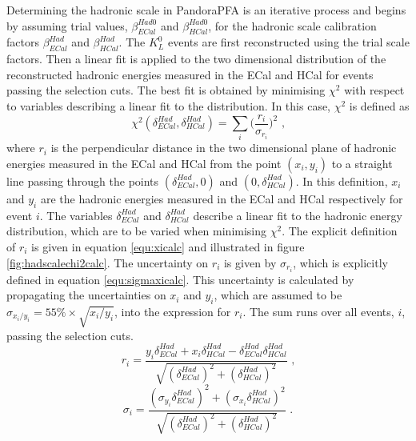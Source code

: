 Determining the hadronic scale in PandoraPFA is an iterative process and begins by assuming trial values, $\beta^{Had0}_{ECal}$ and $\beta^{Had0}_{HCal}$, for the hadronic scale calibration factors $\beta^{Had}_{ECal}$ and $\beta^{Had}_{HCal}$.  The $K^{0}_{L}$ events are first reconstructed using the trial scale factors.  Then a linear fit is applied to the two dimensional distribution of the reconstructed hadronic energies measured in the ECal and HCal for events passing the selection cuts.  The best fit is obtained by minimising $\chi^{2}$ with respect to variables describing a linear fit to the distribution.  In this case, $\chi^{2}$ is defined as
%
\begin{equation}
\chi^{2}(\delta^{Had}_{ECal}, \delta^{Had}_{HCal}) = \sum_{i} \bigg( \frac{r_{i}}{\sigma_{r_{i}}} \bigg)^{2}\text{ ,}
\end{equation}
%
\noindent where $r_{i}$ is the perpendicular distance in the two dimensional plane of hadronic energies measured in the ECal and HCal from the point $(x_{i}, y_{i})$ to a straight line passing through the points $(\delta^{Had}_{ECal}, 0)$ and $(0, \delta^{Had}_{HCal})$.  In this definition, $x_{i}$ and $y_{i}$ are the hadronic energies measured in the ECal and HCal respectively for event $i$.  The variables $\delta^{Had}_{ECal}$ and $\delta^{Had}_{HCal}$ describe a linear fit to the hadronic energy distribution, which are to be varied when minimising $\chi^{2}$.  The explicit definition of $r_{i}$ is given in equation \ref{equ:xicalc} and illustrated in figure \ref{fig:hadscalechi2calc}.  The uncertainty on $r_{i}$ is given by $\sigma_{r_{i}}$, which is explicitly defined in equation \ref{equ:sigmaxicalc}.  This uncertainty is calculated by propagating the uncertainties on $x_{i}$ and $y_{i}$, which are assumed to be $\sigma_{x_{i}/y_{i}} = 55\% \times \sqrt{x_{i}/y_{i}}$, into the expression for $r_{i}$.  The sum runs over all events, $i$, passing the selection cuts.  
%
\begin{equation}
r_{i} = \frac{y_{i} \delta^{Had}_{ECal} + x_{i} \delta^{Had}_{HCal} - \delta^{Had}_{ECal} \delta^{Had}_{HCal}}{\sqrt{(\delta^{Had}_{ECal})^{2} + (\delta^{Had}_{HCal})^{2}}}\text{ ,}
\label{equ:xicalc}
\end{equation}
\begin{equation}
\sigma_{i} = \frac{(\sigma_{y_{i}}  \delta^{Had}_{ECal})^{2} + (\sigma_{x_{i}} \delta^{Had}_{HCal})^{2}}{\sqrt{(\delta^{Had}_{ECal})^{2} + (\delta^{Had}_{HCal})^{2}}}\text{ .}
\label{equ:sigmaxicalc}
\end{equation}
